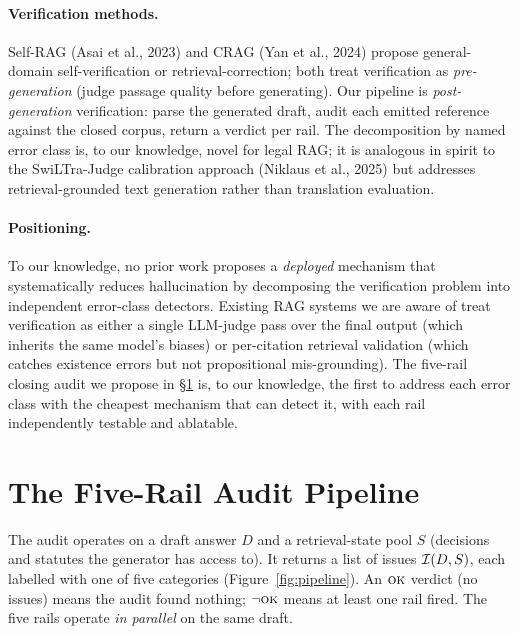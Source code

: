 \documentclass[11pt,a4paper]{article}
\begin{document}
\paragraph{Verification methods.}
Self-RAG (Asai et al., 2023) and CRAG (Yan et al., 2024) propose
general-domain self-verification or retrieval-correction; both treat
verification as \emph{pre-generation} (judge passage quality before
generating).  Our pipeline is \emph{post-generation} verification:
parse the generated draft, audit each emitted reference against the
closed corpus, return a verdict per rail.  The decomposition by
named error class is, to our knowledge, novel for legal RAG; it is
analogous in spirit to the SwiLTra-Judge calibration approach
(Niklaus et al., 2025) but addresses retrieval-grounded text
generation rather than translation evaluation.

\paragraph{Positioning.}  To our knowledge, no prior work proposes
a \emph{deployed} mechanism that systematically reduces hallucination
by decomposing the verification problem into independent
error-class detectors.  Existing RAG systems we are aware of
treat verification as either a single LLM-judge pass over the
final output (which inherits the same model's biases) or
per-citation retrieval validation (which catches existence
errors but not propositional mis-grounding).  The five-rail
closing audit we propose in \S\ref{sec:rails} is, to our
knowledge, the first to address each error class with the
cheapest mechanism that can detect it, with each rail
independently testable and ablatable.


\section{The Five-Rail Audit Pipeline}
\label{sec:rails}

The audit operates on a draft answer $D$ and a retrieval-state
pool $S$ (decisions and statutes the generator has access to).  It
returns a list of issues ${\cal I}(D, S)$, each labelled with one
of five categories (Figure~\ref{fig:pipeline}).  An $\textsc{ok}$
verdict (no issues) means the audit found nothing; $\neg\textsc{ok}$
means at least one rail fired.  The five rails operate
\emph{in parallel} on the same draft.
\end{document}
